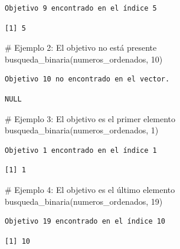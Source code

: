 \documentclass[
  spanish,
  letterpaper,
  DIV=11,
  numbers=noendperiod]{scrreprt}
\newenvironment{Shaded}{\begin{snugshade}}{\end{snugshade}}
\newcommand{\CommentTok}[1]{\textcolor[rgb]{0.37,0.37,0.37}{#1}}
\newcommand{\DecValTok}[1]{\textcolor[rgb]{0.68,0.00,0.00}{#1}}
\newcommand{\FunctionTok}[1]{\textcolor[rgb]{0.28,0.35,0.67}{#1}}
\newcommand{\NormalTok}[1]{\textcolor[rgb]{0.00,0.23,0.31}{#1}}
\begin{document}
\begin{verbatim}
Objetivo 9 encontrado en el índice 5
\end{verbatim}

\begin{verbatim}
[1] 5
\end{verbatim}

\begin{Shaded}
\begin{Highlighting}[]
\CommentTok{\# Ejemplo 2: El objetivo no está presente}
\FunctionTok{busqueda\_binaria}\NormalTok{(numeros\_ordenados, }\DecValTok{10}\NormalTok{)}
\end{Highlighting}
\end{Shaded}

\begin{verbatim}
Objetivo 10 no encontrado en el vector.
\end{verbatim}

\begin{verbatim}
NULL
\end{verbatim}

\begin{Shaded}
\begin{Highlighting}[]
\CommentTok{\# Ejemplo 3: El objetivo es el primer elemento}
\FunctionTok{busqueda\_binaria}\NormalTok{(numeros\_ordenados, }\DecValTok{1}\NormalTok{)}
\end{Highlighting}
\end{Shaded}

\begin{verbatim}
Objetivo 1 encontrado en el índice 1
\end{verbatim}

\begin{verbatim}
[1] 1
\end{verbatim}

\begin{Shaded}
\begin{Highlighting}[]
\CommentTok{\# Ejemplo 4: El objetivo es el último elemento}
\FunctionTok{busqueda\_binaria}\NormalTok{(numeros\_ordenados, }\DecValTok{19}\NormalTok{)}
\end{Highlighting}
\end{Shaded}

\begin{verbatim}
Objetivo 19 encontrado en el índice 10
\end{verbatim}

\begin{verbatim}
[1] 10
\end{verbatim}
\end{document}
